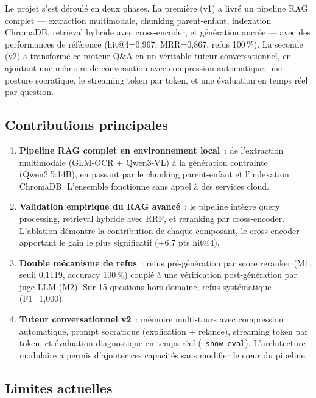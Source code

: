 \documentclass[11pt,a4paper]{article}
\begin{document}
Le projet s'est déroulé en deux phases. La première (v1) a livré un pipeline RAG complet — extraction multimodale, chunking parent-enfant, indexation ChromaDB, retrieval hybride avec cross-encoder, et génération ancrée — avec des performances de référence (hit@4=0,967, MRR=0,867, refus 100\,\%). La seconde (v2) a transformé ce moteur Q\&A en un véritable tuteur conversationnel, en ajoutant une mémoire de conversation avec compression automatique, une posture socratique, le streaming token par token, et une évaluation en temps réel par question.

\subsection{Contributions principales}

\begin{enumerate}
  \item \textbf{Pipeline RAG complet en environnement local}~: de l'extraction multimodale (GLM-OCR + Qwen3-VL) à la génération contrainte (Qwen2.5:14B), en passant par le chunking parent-enfant et l'indexation ChromaDB. L'ensemble fonctionne sans appel à des services cloud.

  \item \textbf{Validation empirique du RAG avancé}~: le pipeline intègre query processing, retrieval hybride avec RRF, et reranking par cross-encoder. L'ablation démontre la contribution de chaque composant, le cross-encoder apportant le gain le plus significatif (+6,7 pts hit@4).

  \item \textbf{Double mécanisme de refus}~: refus pré-génération par score reranker (M1, seuil 0,1119, accuracy 100\,\%) couplé à une vérification post-génération par juge LLM (M2). Sur 15 questions hors-domaine, refus systématique (F1=1,000).

  \item \textbf{Tuteur conversationnel v2}~: mémoire multi-tours avec compression automatique, prompt socratique (explication + relance), streaming token par token, et évaluation diagnostique en temps réel (\texttt{--show-eval}). L'architecture modulaire a permis d'ajouter ces capacités sans modifier le cœur du pipeline.
\end{enumerate}

\subsection{Limites actuelles}
\end{document}

